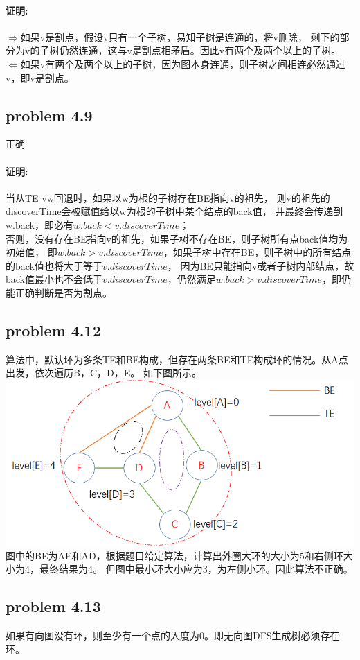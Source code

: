\documentclass[11pt,a4paper,oneside,oldfontcommands]{ctexart}
\begin{document}
\paragraph{证明:}
\textbf{$\Rightarrow$}如果v是割点，假设v只有一个子树，易知子树是连通的，将v删除，
剩下的部分为v的子树仍然连通，这与v是割点相矛盾。因此v有两个及两个以上的子树。\\
\textbf{$\Leftarrow$}如果v有两个及两个以上的子树，因为图本身连通，则子树之间相连必然通过v，即v是割点。
{\subsection*{problem 4.9}}
正确
\paragraph{证明:}
当从TE vw回退时，如果以w为根的子树存在BE指向v的祖先，
则v的祖先的discoverTime会被赋值给以w为根的子树中某个结点的back值，
并最终会传递到w.back，即必有$w.back<v.discoverTime$；\\
\hspace*{20pt}否则，没有存在BE指向v的祖先，如果子树不存在BE，则子树所有点back值均为初始值，
即$w.back>v.discoverTime$，如果子树中存在BE，则子树中的所有结点的back值也将大于等于$v.discoverTime$，
因为BE只能指向v或者子树内部结点，故back值最小也不会低于$v.discoverTime$，仍然满足$w.back>v.discoverTime$，即仍能正确判断是否为割点。
{\subsection*{problem 4.12}}
算法中，默认环为多条TE和BE构成，但存在两条BE和TE构成环的情况。从A点出发，依次遍历B，C，D，E。
如下图所示。\\
\includegraphics{4-12.png}\\
图中的BE为AE和AD，根据题目给定算法，计算出外圈大环的大小为5和右侧环大小为4，最终结果为4。
但图中最小环大小应为3，为左侧小环。因此算法不正确。
\newpage
{\subsection*{problem 4.13}}
如果有向图没有环，则至少有一个点的入度为0。即无向图DFS生成树必须存在环。
\end{document}
